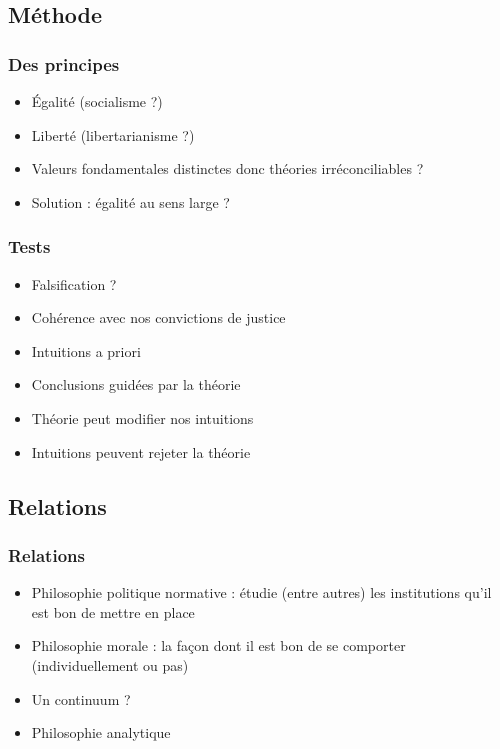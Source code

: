 \documentclass[french]{beamer}
\begin{document}
\subsection{Méthode}
\begin{frame}
	\frametitle{Des principes}
	\begin{itemize}
		\item Égalité (socialisme ?)
		\item Liberté (libertarianisme ?)
		\item Valeurs fondamentales distinctes donc théories irréconciliables ?
		\item Solution \citep{dworkin_taking_1978} : égalité au sens large ?
	\end{itemize}
\end{frame}

\begin{frame}
	\frametitle{Tests}
	\begin{itemize}
		\item Falsification ?
		\item Cohérence avec nos convictions de justice \citep{goodman_fact_1983, rawls_theory_1999}
		\item Intuitions a priori
		\item Conclusions guidées par la théorie
		\item Théorie peut modifier nos intuitions
		\item Intuitions peuvent rejeter la théorie
	\end{itemize}
\end{frame}

\subsection{Relations}
\begin{frame}
	\frametitle{Relations}
	\begin{itemize}
		\item Philosophie politique normative : étudie (entre autres) les institutions qu’il est bon de mettre en place
		\item Philosophie morale : la façon dont il est bon de se comporter (individuellement ou pas)
		\item Un continuum \citep{kymlicka_contemporary_2001} ? %
		\item Philosophie analytique
	\end{itemize}
\end{frame}
\end{document}
